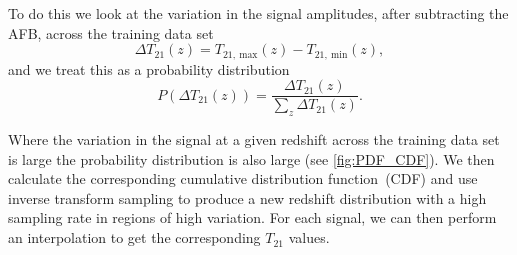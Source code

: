 To do this we look at the variation in the signal amplitudes, after subtracting the AFB, across the training data set
\begin{equation}
    \Delta T_{21}(z) = T_{21,~\mathrm{max}}(z) - T_{21,~\mathrm{min}}(z),
    \label{eq:resamp-dif}
\end{equation}
and we treat this as a probability distribution
\begin{equation}
    P(\Delta T_{21}(z)) = \frac{\Delta T_{21}(z)}{\sum_z \Delta T_{21}(z)}.
    \label{eq:resamp-prob}
\end{equation}

Where the variation in the signal at a given redshift across the training data set is large the probability distribution is also large (see \cref{fig:PDF_CDF}). We then calculate the corresponding cumulative distribution function~(CDF) and use inverse transform sampling to produce a new redshift distribution with a high sampling rate in regions of high variation. For each signal, we can then perform an interpolation to get the corresponding $T_{21}$ values. 

